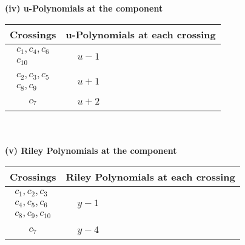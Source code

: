 \documentclass[1p]{elsarticle_modified}
\theoremstyle{definition}
\begin{document}
\newpage\renewcommand{\arraystretch}{1}
\flushleft \textbf{(iv) u-Polynomials at the component}\newline \\
\begin{tabular}{m{50pt}|m{274pt}}
Crossings & \hspace{64pt}u-Polynomials at each crossing \\
\hline $$\begin{aligned}c_{1},c_{4},c_{6}\\c_{10}\end{aligned}$$&$\begin{aligned}
&u-1
\end{aligned}$\\
\hline $$\begin{aligned}c_{2},c_{3},c_{5}\\c_{8},c_{9}\end{aligned}$$&$\begin{aligned}
&u+1
\end{aligned}$\\
\hline $$\begin{aligned}c_{7}\end{aligned}$$&$\begin{aligned}
&u+2
\end{aligned}$\\
\hline
\end{tabular}\\~\\
\newpage\renewcommand{\arraystretch}{1}
\flushleft \textbf{(v) Riley Polynomials at the component}\newline \\
\begin{tabular}{m{50pt}|m{274pt}}
Crossings & \hspace{64pt}Riley Polynomials at each crossing \\
\hline $$\begin{aligned}c_{1},c_{2},c_{3}\\c_{4},c_{5},c_{6}\\c_{8},c_{9},c_{10}\end{aligned}$$&$\begin{aligned}
&y-1
\end{aligned}$\\
\hline $$\begin{aligned}c_{7}\end{aligned}$$&$\begin{aligned}
&y-4
\end{aligned}$\\
\hline
\end{tabular}\\~\\
\end{document}
